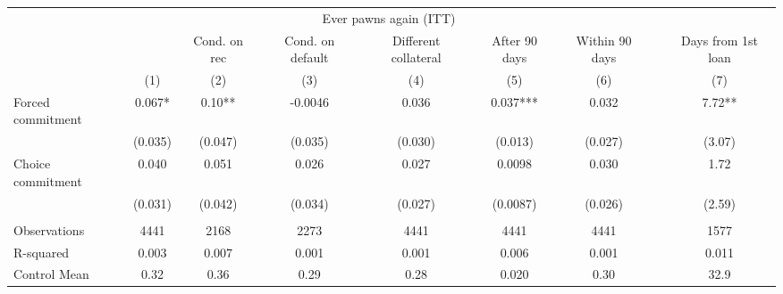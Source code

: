 \begin{tabular}{lcccccccc}
\toprule
      & \multicolumn{6}{c}{Ever pawns again (ITT)}    &       &  \\
\cmidrule{2-7}      &       & Cond. on rec & Cond. on default & Different collateral & After 90 days & Within 90 days &       & Days from 1st loan  \\
\midrule
\midrule
      & (1)   & (2)   & (3)   & (4)   & (5)   & (6)   &       & (7) \\
\midrule
\midrule
Forced commitment & 0.067* & 0.10** & -0.0046 & 0.036 & 0.037*** & 0.032 &       & 7.72** \\
      & (0.035) & (0.047) & (0.035) & (0.030) & (0.013) & (0.027) &       & (3.07) \\
Choice commitment & 0.040 & 0.051 & 0.026 & 0.027 & 0.0098 & 0.030 &       & 1.72 \\
      & (0.031) & (0.042) & (0.034) & (0.027) & (0.0087) & (0.026) &       & (2.59) \\
      &       &       &       &       &       &       &       &  \\
\midrule
Observations & 4441  & 2168  & 2273  & 4441  & 4441  & 4441  &       & 1577 \\
R-squared & 0.003 & 0.007 & 0.001 & 0.001 & 0.006 & 0.001 &       & 0.011 \\
Control Mean & 0.32  & 0.36  & 0.29  & 0.28  & 0.020 & 0.30  &       & 32.9 \\
\bottomrule
\bottomrule
\end{tabular}%
